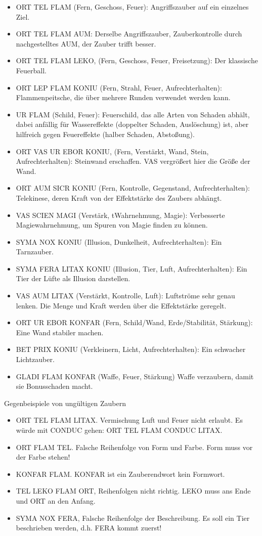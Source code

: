 \documentclass{article}
\begin{document}
\begin{itemize}
\item ORT TEL FLAM (Fern, Geschoss, Feuer): Angriffszauber auf ein einzelnes Ziel.
\item ORT TEL FLAM AUM: Derselbe Angriffszauber, Zauberkontrolle durch nachgestelltes AUM, der Zauber trifft besser.
\item ORT TEL FLAM LEKO, (Fern, Geschoss, Feuer, Freisetzung): Der klassische Feuerball.
\item ORT LEP FLAM KONIU (Fern, Strahl, Feuer, Aufrechterhalten): Flammenpeitsche, die über mehrere Runden verwendet werden kann.
\item UR FLAM (Schild, Feuer): Feuerschild, das alle Arten von Schaden abhält, dabei anfällig für Wassereffekte (doppelter Schaden, Auslöschung) ist, aber hilfreich gegen Feuereffekte (halber Schaden, Abstoßung).
\item ORT VAS UR EBOR KONIU, (Fern, Verstärkt, Wand, Stein, Aufrechterhalten): Steinwand erschaffen. VAS vergrößert hier die Größe der Wand.
\item ORT AUM SICR KONIU (Fern, Kontrolle, Gegenstand, Aufrechterhalten): Telekinese, deren Kraft von der Effektstärke des Zaubers abhängt.
\item VAS SCIEN MAGI (Verstärk, tWahrnehmung, Magie): Verbesserte Magiewahrnehmung, um Spuren von Magie finden zu können.
\item SYMA NOX KONIU (Illusion, Dunkelheit, Aufrechterhalten): Ein Tarnzauber.
\item SYMA FERA LITAX KONIU (Illusion, Tier, Luft, Aufrechterhalten): Ein Tier der Lüfte als Illusion darstellen.
\item VAS AUM LITAX (Verstärkt, Kontrolle, Luft): Luftströme sehr genau lenken. Die Menge und Kraft werden über die Effektstärke geregelt.
\item ORT UR EBOR KONFAR (Fern, Schild/Wand, Erde/Stabilität, Stärkung): Eine Wand stabiler machen.
\item BET PRIX KONIU (Verkleinern, Licht, Aufrechterhalten): Ein schwacher Lichtzauber.
\item GLADI FLAM KONFAR (Waffe, Feuer, Stärkung) Waffe verzaubern, damit sie Bonusschaden macht.
\end{itemize}

Gegenbeispiele von ungültigen Zaubern

\begin{itemize}
\item ORT TEL FLAM LITAX. Vermischung Luft und Feuer nicht erlaubt. Es würde mit CONDUC gehen: ORT TEL FLAM CONDUC LITAX.
\item ORT FLAM TEL. Falsche Reihenfolge von Form und Farbe. Form muss vor der Farbe stehen!
\item KONFAR FLAM. KONFAR ist ein Zauberendwort kein Formwort.
\item TEL LEKO FLAM ORT, Reihenfolgen nicht richtig. LEKO muss ans Ende und ORT an den Anfang.
\item SYMA NOX FERA, Falsche Reihenfolge der Beschreibung. Es soll ein Tier beschrieben werden, d.h. FERA kommt zuerst!
\end{itemize}
\end{document}
